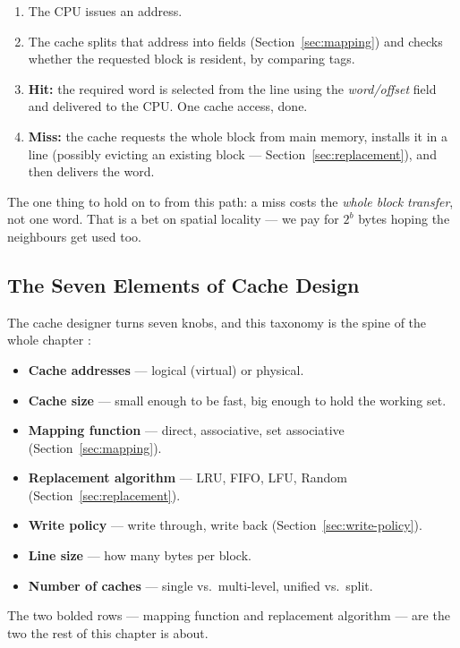 \documentclass[11pt]{article}
\begin{document}
\begin{enumerate}
  \item The CPU issues an address.
  \item The cache splits that address into fields (Section~\ref{sec:mapping}) and checks whether the requested block is resident, by comparing tags.
  \item \textbf{Hit:} the required word is selected from the line using the \emph{word/offset} field and delivered to the CPU. One cache access, done.
  \item \textbf{Miss:} the cache requests the whole block from main memory, installs it in a line (possibly evicting an existing block --- Section~\ref{sec:replacement}), and then delivers the word.
\end{enumerate}

The one thing to hold on to from this path: a miss costs the \emph{whole block transfer}, not one word. That is a bet on spatial locality --- we pay for $2^b$ bytes hoping the neighbours get used too.

\subsection{The Seven Elements of Cache Design}

The cache designer turns seven knobs, and this taxonomy is the spine of the whole chapter \cite[Table~5.1, PDF p.~184]{Stallings2015_computer_organization}:

\begin{itemize}
  \item \textbf{Cache addresses} --- logical (virtual) or physical.
  \item \textbf{Cache size} --- small enough to be fast, big enough to hold the working set.
  \item \textbf{Mapping function} --- direct, associative, set associative (Section~\ref{sec:mapping}).
  \item \textbf{Replacement algorithm} --- LRU, FIFO, LFU, Random (Section~\ref{sec:replacement}).
  \item \textbf{Write policy} --- write through, write back (Section~\ref{sec:write-policy}).
  \item \textbf{Line size} --- how many bytes per block.
  \item \textbf{Number of caches} --- single vs.\ multi-level, unified vs.\ split.
\end{itemize}

The two bolded rows --- mapping function and replacement algorithm --- are the two the rest of this chapter is about.
\end{document}
